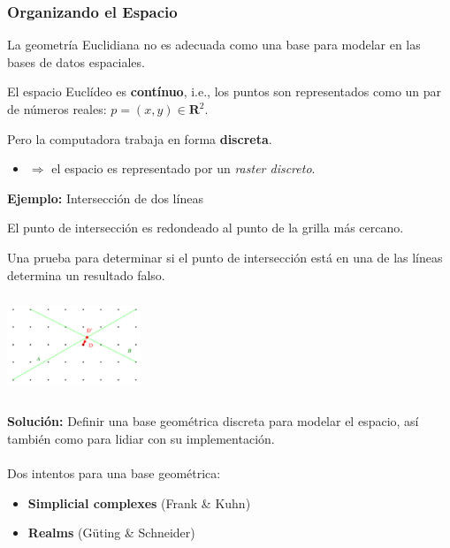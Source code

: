 \documentclass[a4paper,12pt,oneside]{report}
\begin{document}
\subsubsection*{Organizando el Espacio}
La geometr\'ia Euclidiana no es adecuada como una base para modelar en las bases de datos espaciales.
\begin{itemize}
\begin{small}
\item El espacio Eucl\'ideo es \textbf{cont\'inuo}, i.e., los puntos son representados como un par de n\'umeros reales: $p = (x,y) \in \mathbf{R}^{2}$.
\item Pero la computadora trabaja en forma \textbf{discreta}.
\begin{itemize}
\item $\Rightarrow$ el espacio es representado por un \textit{raster discreto}.
\end{itemize}
\end{small}
\end{itemize}
\textbf{Ejemplo:} Intersecci\'on de dos l\'ineas
\begin{itemize}
\begin{small}
\item El punto de intersecci\'on es redondeado al punto de la grilla m\'as cercano.
\item Una prueba para determinar si el punto de intersecci\'on est\'a en una de las l\'ineas determina un resultado falso.
\end{small}
\end{itemize}
\begin{center}
\includegraphics[width=4cm,height=3cm]{Imagenes/1.png}
\end{center}
\textbf{Soluci\'on:} Definir una base geom\'etrica discreta para modelar el espacio, as\'i tambi\'en como para lidiar con su implementaci\'on.\\
\ \\
Dos intentos para una base geom\'etrica:
\begin{itemize}
\item \textbf{Simplicial complexes} (Frank \& Kuhn)
\item \textbf{Realms} (G\"uting \& Schneider)
\end{itemize}
\end{document}
